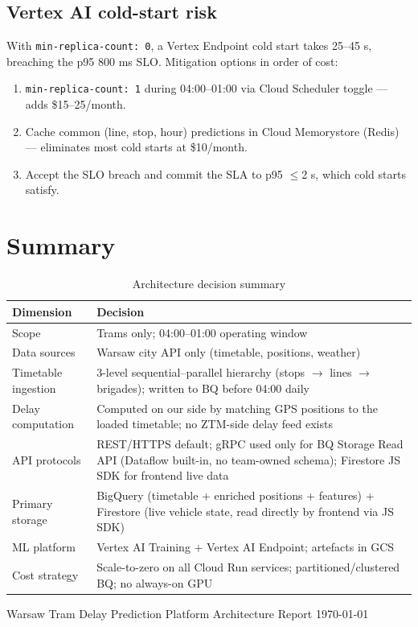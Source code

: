 \documentclass[11pt,a4paper]{article}
\newcommand{\hd}[1]{\textbf{\small #1}}
\begin{document}
\subsection{Vertex AI cold-start risk}

With \texttt{min-replica-count: 0}, a Vertex Endpoint cold start takes
25--45 s, breaching the p95 800 ms SLO. Mitigation options in order of cost:

\begin{enumerate}[itemsep=2pt]
  \item \texttt{min-replica-count: 1} during 04:00--01:00 via Cloud Scheduler
    toggle --- adds \$15--25/month.
  \item Cache common (line, stop, hour) predictions in Cloud Memorystore
    (Redis) --- eliminates most cold starts at \$10/month.
  \item Accept the SLO breach and commit the SLA to p95 $\le$2 s,
    which cold starts satisfy.
\end{enumerate}


\section{Summary}

\begin{table}[H]
\centering
\caption{Architecture decision summary}
\renewcommand{\arraystretch}{1.38}
\begin{tabularx}{\linewidth}{L{3.4cm} X}
\toprule
\hd{Dimension} & \hd{Decision} \\
\midrule
{}
Scope & Trams only; 04:00--01:00 operating window \\
Data sources & Warsaw city API only (timetable, positions, weather) \\
Timetable ingestion
  & 3-level sequential--parallel hierarchy (stops $\to$ lines $\to$ brigades);
    written to BQ before 04:00 daily \\
Delay computation
  & Computed on our side by matching GPS positions to the loaded timetable;
    no ZTM-side delay feed exists \\
API protocols
  & REST/HTTPS default; gRPC used only for BQ Storage Read API
    (Dataflow built-in, no team-owned schema);
    Firestore JS SDK for frontend live data \\
Primary storage
  & BigQuery (timetable + enriched positions + features) +
    Firestore (live vehicle state, read directly by frontend via JS SDK) \\
ML platform & Vertex AI Training + Vertex AI Endpoint; artefacts in GCS \\
Cost strategy & Scale-to-zero on all Cloud Run services;
    partitioned/clustered BQ; no always-on GPU \\

\bottomrule
\end{tabularx}
\end{table}

\vfill
\begin{center}
\small\color{textmuted}
Warsaw Tram Delay Prediction Platform \textperiodcentered{}
Architecture Report \textperiodcentered{} \today
\end{center}
\end{document}
